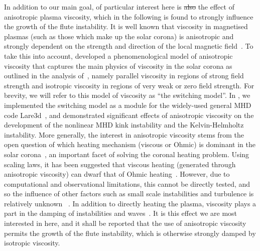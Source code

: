 \documentclass[fleqn,usenatbib]{mnras}
\newcommand{\rev}[1]{{\color{red} {#1}}}
\newcommand{\revcite}[1]{{\color{red} \underline{#1}}}
\begin{document}
In addition to our main goal, of particular interest here is
\rev{\sout{also}} the effect of
anisotropic plasma viscosity, which in the following is found to strongly
influence the growth of the flute instability. It is well known that viscosity
in magnetised plasmas (such as those which make up the solar corona) is
anisotropic and strongly dependent on the strength and direction of the local
magnetic
field~\citep{hollwegViscosityChewGoldbergerLowEquations1986,hollwegViscosityMagnetizedPlasma1985,braginskiiTransportProcessesPlasma1965}.
To take this into account,
\revcite{\citet{mactaggartBraginskiiMagnetohydrodynamicsArbitrary2017}}
developed a phenomenological model of anisotropic  viscosity
that captures the main physics of viscosity in the solar corona as outlined in the
analysis of~\cite{braginskiiTransportProcessesPlasma1965}, namely parallel
viscosity in regions of strong field  strength and isotropic viscosity in
regions of very weak or zero field strength. For brevity, we will refer to this
model of viscosity as ``the switching model''.
In \revcite{\citet{quinnEffectAnisotropicViscosity2020,quinnKelvinHelmholtzInstabilityCollapse2021}}, 
we implemented the switching model as a module for the widely-used general MHD
code Lare3d~\citep{arberStaggeredGridLagrangian2001}, and demonstrated
significant effects of anisotropic viscosity on the development of the
nonlinear MHD kink instability and the Kelvin-Helmholtz instability. More
generally, the interest in anisotropic viscosity stems from the open question
of which heating mechanism (viscous or Ohmic) is dominant in the solar
corona~\citep{klimchukSolvingCoronalHeating2006}, an important facet of solving
the coronal heating problem. Using scaling laws, it has been suggested that
viscous heating (generated through anisotropic viscosity) can dwarf that of
Ohmic
heating~\citep{craigAnisotropicViscousDissipation2009a,litvinenkoViscousEnergyDissipation2005}.
However, due to computational and observational limitations, this cannot be
directly tested, and so the influence of other factors such as small scale
instabilities and turbulence is relatively
unknown~\revcite{\citep{klimchukSolvingCoronalHeating2006}}. In addition to directly
heating the plasma, viscosity plays a part in the damping of instabilities and
waves~\citep{rudermanSlowSurfaceWave2000}. It is this effect we are most
interested in here, and it shall be reported that the use of anisotropic
viscosity permits the growth of the flute instability, which is otherwise
strongly damped by isotropic viscosity.
\end{document}
